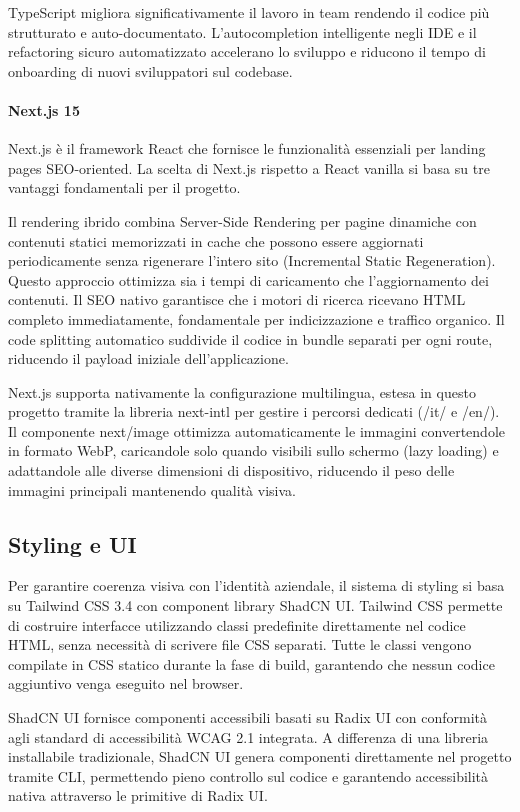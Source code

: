 TypeScript migliora significativamente il lavoro in team rendendo il codice più 
strutturato e auto-documentato. L'autocompletion intelligente negli IDE e il 
refactoring sicuro automatizzato accelerano lo sviluppo e riducono il tempo di 
onboarding di nuovi sviluppatori sul codebase.

\paragraph{Next.js 15}
Next.js è il framework React che fornisce le funzionalità essenziali per landing 
pages SEO-oriented. La scelta di Next.js rispetto a React vanilla si basa su 
tre vantaggi fondamentali per il progetto.

Il rendering ibrido combina Server-Side Rendering per pagine dinamiche con 
contenuti statici memorizzati in cache che possono essere aggiornati 
periodicamente senza rigenerare l'intero sito (Incremental Static Regeneration). 
Questo approccio ottimizza sia i tempi di caricamento che l'aggiornamento dei 
contenuti. Il SEO nativo garantisce che i motori di ricerca ricevano HTML 
completo immediatamente, fondamentale per indicizzazione e traffico organico. 
Il code splitting automatico suddivide il codice in bundle separati per ogni 
route, riducendo il payload iniziale dell'applicazione.

Next.js supporta nativamente la configurazione multilingua, estesa in questo 
progetto tramite la libreria next-intl per gestire i percorsi dedicati (/it/ e 
/en/). Il componente next/image ottimizza automaticamente le immagini 
convertendole in formato WebP, caricandole solo quando visibili sullo schermo 
(lazy loading) e adattandole alle diverse dimensioni di dispositivo, riducendo 
il peso delle immagini principali mantenendo qualità visiva.

\subsection{Styling e UI}

Per garantire coerenza visiva con l'identità aziendale, il sistema di styling 
si basa su Tailwind CSS 3.4 con component library ShadCN UI. Tailwind CSS 
permette di costruire interfacce utilizzando classi predefinite direttamente nel 
codice HTML, senza necessità di scrivere file CSS separati. Tutte le classi 
vengono compilate in CSS statico durante la fase di build, garantendo che 
nessun codice aggiuntivo venga eseguito nel browser.

ShadCN UI fornisce componenti accessibili basati su Radix UI con conformità agli 
standard di accessibilità WCAG 2.1 integrata. A differenza di una libreria 
installabile tradizionale, ShadCN UI genera componenti direttamente nel progetto 
tramite CLI, permettendo pieno controllo sul codice e garantendo accessibilità 
nativa attraverso le primitive di Radix UI.

